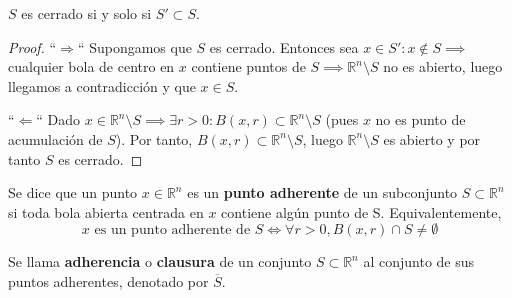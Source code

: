 \begin{teorema}
    $S$ es cerrado si y solo si $S' \subset S$.
\end{teorema}
\begin{proof}
    ``$\Rightarrow$``
    Supongamos que $S$ es cerrado. Entonces sea $x \in S' : x \notin S \implies $ cualquier bola de centro en  $x$ contiene puntos de $S \implies \mathbb{R}^n \setminus S$ no es abierto, luego llegamos a contradicción y que $x \in S$.

    ``$\Leftarrow$``
    Dado $x \in \mathbb{R}^n \setminus S \implies \exists r > 0 : B(x, r) \subset \mathbb{R}^n \setminus S$ (pues $x$ no es punto de acumulación de $S$). Por tanto, $B(x, r) \subset \mathbb{R}^n \setminus S$, luego $\mathbb{R}^n \setminus S$ es abierto y por tanto $S$ es cerrado.
\end{proof}
\begin{definición}
    Se dice que un punto $x \in \mathbb{R}^n$ es un \textbf{punto adherente} de un subconjunto $S \subset \mathbb{R}^n$ si toda bola abierta centrada en $x$ contiene algún punto de S. Equivalentemente,
    $$x \text{ es un punto adherente de } S \Leftrightarrow \forall r > 0, B(x, r) \cap S \neq \emptyset$$
\end{definición}
\begin{definición}
    Se llama \textbf{adherencia} o \textbf{clausura} de un conjunto $S \subset \mathbb{R}^n$ al conjunto de sus puntos adherentes, denotado por $\overline{S}$.
\end{definición}

